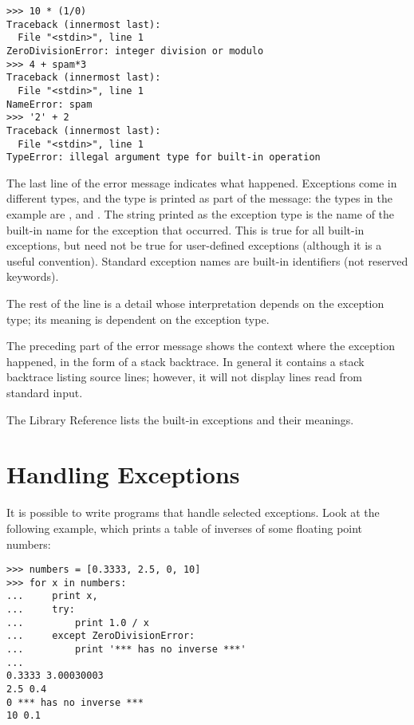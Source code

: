 \documentclass{manual}
\begin{document}
\begin{verbatim}
>>> 10 * (1/0)
Traceback (innermost last):
  File "<stdin>", line 1
ZeroDivisionError: integer division or modulo
>>> 4 + spam*3
Traceback (innermost last):
  File "<stdin>", line 1
NameError: spam
>>> '2' + 2
Traceback (innermost last):
  File "<stdin>", line 1
TypeError: illegal argument type for built-in operation
\end{verbatim}

The last line of the error message indicates what happened.
Exceptions come in different types, and the type is printed as part of
the message: the types in the example are
,
and
.
The string printed as the exception type is the name of the built-in
name for the exception that occurred.  This is true for all built-in
exceptions, but need not be true for user-defined exceptions (although
it is a useful convention).
Standard exception names are built-in identifiers (not reserved
keywords).

The rest of the line is a detail whose interpretation depends on the
exception type; its meaning is dependent on the exception type.

The preceding part of the error message shows the context where the
exception happened, in the form of a stack backtrace.
In general it contains a stack backtrace listing source lines; however,
it will not display lines read from standard input.

The Library Reference lists the built-in exceptions and their
meanings.

\section{Handling Exceptions \label{handling}}

It is possible to write programs that handle selected exceptions.
Look at the following example, which prints a table of inverses of
some floating point numbers:

\begin{verbatim}
>>> numbers = [0.3333, 2.5, 0, 10]
>>> for x in numbers:
...     print x,
...     try:
...         print 1.0 / x
...     except ZeroDivisionError:
...         print '*** has no inverse ***'
...     
0.3333 3.00030003
2.5 0.4
0 *** has no inverse ***
10 0.1
\end{verbatim}
\end{document}
